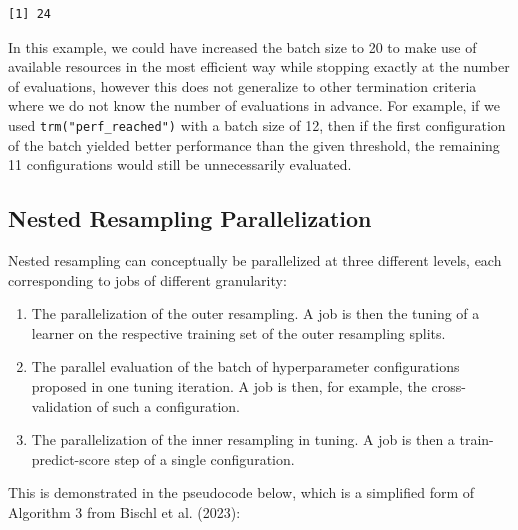 \begin{verbatim}
[1] 24
\end{verbatim}

In this example, we could have increased the batch size to 20 to make
use of available resources in the most efficient way while stopping
exactly at the number of evaluations, however this does not generalize
to other termination criteria where we do not know the number of
evaluations in advance. For example, if we used
\texttt{trm("perf\_reached")} with a batch size of 12, then if the first
configuration of the batch yielded better performance than the given
threshold, the remaining 11 configurations would still be unnecessarily
evaluated.

\hypertarget{sec-nested-resampling-parallelization}{%
\subsection{Nested Resampling
Parallelization}\label{sec-nested-resampling-parallelization}}

Nested resampling can conceptually be parallelized at three different
levels, each corresponding to jobs of different granularity:

\begin{enumerate}
\def\labelenumi{\arabic{enumi}.}
\tightlist
\item
  The parallelization of the outer resampling. A job is then the tuning
  of a learner on the respective training set of the outer resampling
  splits.
\item
  The parallel evaluation of the batch of hyperparameter configurations
  proposed in one tuning iteration. A job is then, for example, the
  cross-validation of such a configuration.
\item
  The parallelization of the inner resampling in tuning. A job is then a
  train-predict-score step of a single configuration.
\end{enumerate}

This is demonstrated in the pseudocode below, which is a simplified form
of Algorithm 3 from Bischl et al. (2023):

